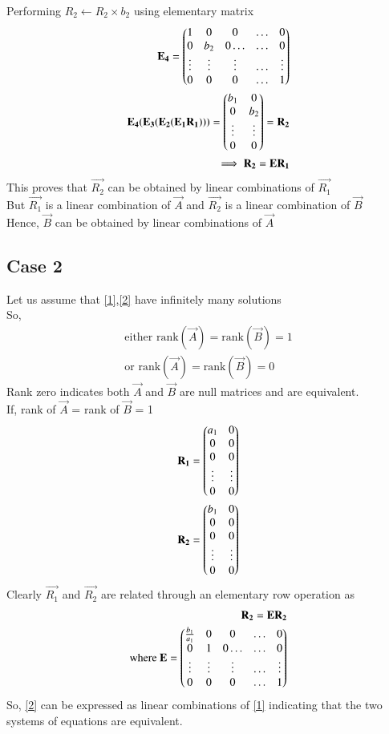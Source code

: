 \documentclass[journal,12pt,twocolumn]{IEEEtran}
\begin{document}
Performing  $R_2\leftarrow R_2 \times b_2$ using elementary matrix
\begin{align}
\mathbf{E_4}=\begin{pmatrix}1&0&0&\hdots&0\\0&b_2&0\hdots&\hdots&0\\\vdots&\vdots&\vdots&\hdots&\vdots\\0&0&0&\hdots&1\end{pmatrix}\\
\mathbf{E_4}(\mathbf{E_3}(\mathbf{E_2}(\mathbf{E_1}\mathbf{R_1})))=\begin{pmatrix}b_1&0\\0&b_2\\\vdots&\vdots\\0&0\end{pmatrix}=\mathbf{R_2}\\
\implies \mathbf{R_2}=\mathbf{E}\mathbf{R_1}
\end{align}
This proves that $\vec{R_2}$ can be obtained by linear combinations of $\vec{R_1}$\\
But $\vec{R_1}$ is a linear combination of $\vec{A}$ and $\vec{R_2}$ is a linear combination of $\vec{B}$\\
Hence, $\vec{B}$ can be obtained by linear combinations of $\vec{A}$
\subsection{Case 2}
Let us assume that \eqref{1},\eqref{2} have infinitely many solutions\\
So,
\begin{align}
\text{either rank}(\vec{A}) = \text{rank}(\vec{B}) = 1 \\
\text{or rank}(\vec{A})= \text{rank}(\vec{B}) = 0
\end{align}
Rank zero indicates both $\vec{A}$ and $\vec{B}$ are null matrices and are equivalent.\\
If, rank of $\vec{A}$ = rank of $\vec{B}$ = 1
\begin{align}
 \mathbf{R_1}= \begin{pmatrix}a_1&0\\0&0\\0&0\\ \vdots & \vdots \\0&0\end{pmatrix} \\
 \mathbf{R_2}= \begin{pmatrix}b_1&0\\0&0\\0&0\\ \vdots & \vdots \\0&0\end{pmatrix} 
\end{align}
Clearly $\vec{R_1}$ and $\vec{R_2}$ are related through an elementary row operation as
\begin{align}
    \mathbf{R_2}=\mathbf{E}\mathbf{R_2}\\
    \text{where } \mathbf{E}=\begin{pmatrix}\frac{b_1}{a_1}&0&0&\hdots&0\\0&1&0\hdots&\hdots&0\\\vdots&\vdots&\vdots&\hdots&\vdots\\0&0&0&\hdots&1\end{pmatrix}
\end{align}
So, \eqref{2} can be expressed as linear combinations of \eqref{1} indicating that the two systems of equations are equivalent.
\end{document}

